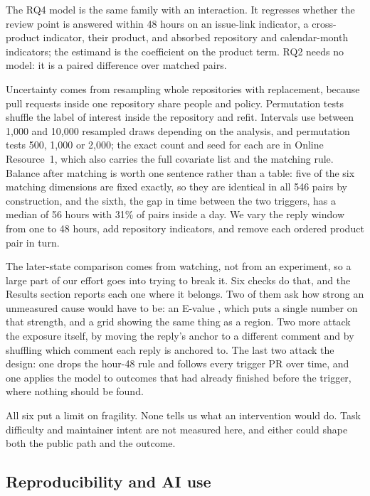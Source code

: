 \documentclass[lineno,pdflatex,sn-basic]{sn-jnl}
\begin{document}
The RQ4 model is the same family with an interaction. It regresses whether the
review point is answered within 48 hours on an issue-link indicator, a
cross-product indicator, their product, and absorbed repository and calendar-month
indicators; the estimand is the coefficient on the product term. RQ2 needs no
model: it is a paired difference over matched pairs.

Uncertainty comes from resampling whole repositories with replacement, because
pull requests inside one repository share people and policy. Permutation tests
shuffle the label of interest inside the repository and refit. Intervals use between 1,000 and 10,000
resampled draws depending on the analysis, and permutation tests 500, 1,000 or
2,000;
the exact count and seed for each are in Online Resource~1, which also
carries the full covariate list and the matching rule. Balance after matching is
worth one sentence rather than a table: five of the six matching dimensions are
fixed exactly, so they are identical in all 546 pairs by construction, and the
sixth, the gap in time between the two triggers, has a median of
56 hours with 31\% of pairs
inside a day. We vary the reply window from one to 48 hours, add repository
indicators, and remove each ordered product pair in turn.

The later-state comparison comes from watching, not from an experiment, so a
large part of our effort goes into trying to break it. Six checks do that, and
the Results section reports each one where it belongs. Two of them ask how strong
an unmeasured cause would have to be: an E-value \citep{vanderweele2017evalue},
which puts a single number on that strength, and a grid showing the same thing as
a region. Two more attack the exposure itself, by moving the reply's anchor to a
different comment and by shuffling which comment each reply is anchored to. The
last two attack the design: one drops the hour-48 rule and follows every trigger
PR over time, and one applies the model to outcomes that had already finished
before the trigger, where nothing should be found.

All six put a limit on fragility. None tells us what an intervention would do.
Task difficulty and maintainer intent are not measured here, and either could
shape both the public path and the outcome.

\subsection{Reproducibility and AI use}
\end{document}

